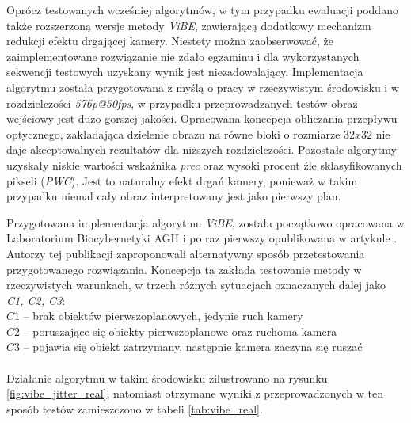 Oprócz testowanych wcześniej algorytmów, w tym przypadku ewaluacji poddano także rozszerzoną wersje metody \textit{ViBE}, zawierającą dodatkowy mechanizm redukcji efektu drgającej kamery. Niestety można zaobserwować, że zaimplementowane rozwiązanie nie zdało egzaminu i dla wykorzystanych sekwencji testowych uzyskany wynik jest niezadowalający. Implementacja algorytmu została przygotowana z myślą o pracy w rzeczywistym środowisku i w rozdzielczości \textit{576p@50fps}, w przypadku przeprowadzanych testów obraz wejściowy jest dużo gorszej jakości. Opracowana koncepcja obliczania przepływu optycznego, zakładająca dzielenie obrazu na równe bloki o rozmiarze $32x32$ nie daje akceptowalnych rezultatów dla niższych rozdzielczości. Pozostałe algorytmy uzyskały niskie wartości wskaźnika \textit{prec} oraz wysoki procent źle sklasyfikowanych pikseli (\textit{PWC}). Jest to naturalny efekt drgań kamery, ponieważ w takim przypadku niemal cały obraz interpretowany jest jako pierwszy plan.

Przygotowana implementacja algorytmu \textit{ViBE}, została początkowo opracowana w Laboratorium Biocybernetyki AGH i po raz pierwszy opublikowana w artykule \cite{kryjak_14_vibe}. Autorzy tej publikacji zaproponowali alternatywny sposób przetestowania przygotowanego rozwiązania. Koncepcja ta zakłada testowanie metody w rzeczywistych warunkach, w trzech różnych sytuacjach oznaczanych dalej jako \textit{C1, C2, C3}:\\
\-\hspace{1cm} $C1$ -- brak obiektów pierwszoplanowych, jedynie ruch kamery\\
\-\hspace{1cm} $C2$ -- poruszające się obiekty pierwszoplanowe oraz ruchoma kamera\\
\-\hspace{1cm} $C3$ -- pojawia się obiekt zatrzymany, następnie kamera zaczyna się ruszać\\
\\
\noindent Działanie algorytmu w takim środowisku zilustrowano na rysunku \ref{fig:vibe_jitter_real}, natomiast otrzymane wyniki z przeprowadzonych w ten sposób testów zamieszczono w tabeli \ref{tab:vibe_real}.

